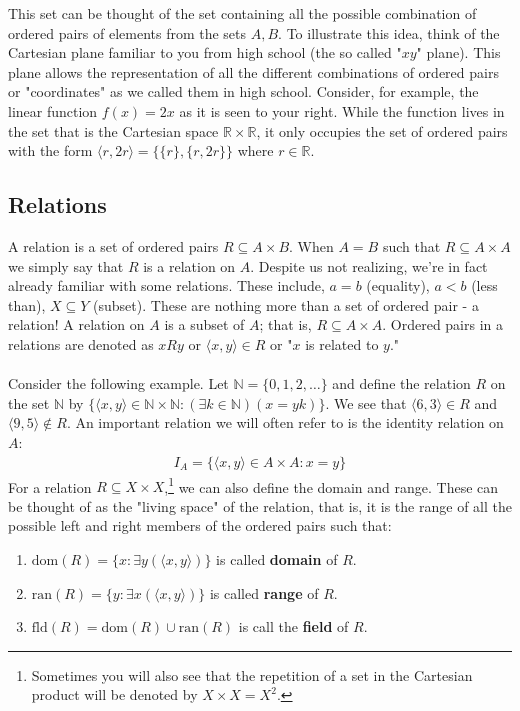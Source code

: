 \documentclass{tufte-handout} %
\theoremstyle{definition}
\theoremstyle{remark}
\newcommand{\R}{\mathbb{R}}
\newcommand{\N}{\mathbb{N}}
\begin{document}
This set can be thought of the set containing all the possible combination of ordered pairs of elements from the sets $A,B$. To illustrate this idea, think of the Cartesian plane familiar to you from high school (the so called "$xy$" plane). This plane allows the representation of all the different combinations of ordered pairs or "coordinates" as we called them in high school. Consider, for example, 
the linear function $f(x)=2x$ as it is seen to your right. While the function lives in the set that is the Cartesian space $\R \times \R$, it only occupies the set of ordered pairs with the form $\langle r, 2r \rangle = \{\{r\}, \{r,2r\}\}$ where $r\in \R$.

\subsection{Relations}
A relation is a set of ordered pairs $R\subseteq A\times B$. When $A=B$ such that $R\subseteq A\times A$ we simply say that $R$ is a relation on $A$. Despite us not realizing, we're in fact already familiar with some relations. These include, $a=b$ (equality), $a<b$ (less than), $X\subseteq Y$ (subset). These are nothing more than a set of ordered pair - a relation! A relation on $A$ is a subset of $A$; that is, $R \subseteq A\times A$. Ordered pairs in a relations are denoted as $xRy$ or $\langle x,y \rangle \in R$ or "$x$ is related to $y$." \\\\
Consider the following example. Let $\N= \{0,1,2,\ldots\}$ and define the relation $R$ on the set $\N$ by $\{\langle x,y \rangle\in \N\times \N: (\exists k \in \N)(x=yk)\}$. We see that $\langle 6,3 \rangle \in R$ and $\langle 9,5 \rangle \not\in R$.  
An important relation we will often refer to is the identity relation on $A$:
\begin{align*}
    I_{A} = \{\langle x,y \rangle \in A \times A: x=y \}
\end{align*}
For a relation $R \subseteq X \times X$,\footnote{Sometimes you will also see that the repetition of a set in the Cartesian product will be denoted by $X \times X = X^{2}$.} we can also define the domain and range. These can be thought of as the "living space" of the relation, that is, it is the range of all the possible left and right members of the ordered pairs such that:
\begin{enumerate}
    \item $\mathrm{dom}(R)= \{x: \exists y(\langle x,y \rangle)\}$ is called \textbf{domain} of $R$. 
    \item $\mathrm{ran}(R)= \{y: \exists x(\langle x,y \rangle)\}$ is called \textbf{range} of $R$. 
    \item $\mathrm{fld}(R)= \mathrm{dom}(R) \cup \mathrm{ran}(R)$ is call the \textbf{field} of $R$.
\end{enumerate}
\end{document}
